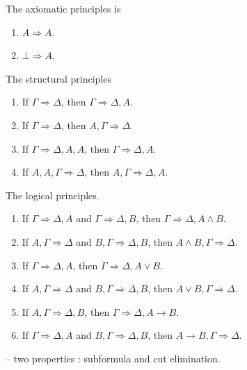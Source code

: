 \begin{definition}
    The axiomatic principles is 
    \begin{enumerate}
        \item \(A \Rightarrow A\).
        \item \(\bot \Rightarrow A\).
    \end{enumerate}
    The structural principles
    \begin{enumerate}
        \item If \(\Gamma \Rightarrow \Delta\), then \(\Gamma \Rightarrow \Delta,A\).
        \item If \(\Gamma \Rightarrow \Delta\), then \(A,\Gamma \Rightarrow \Delta\).
        \item If \(\Gamma \Rightarrow \Delta,A,A\), then \(\Gamma \Rightarrow \Delta,A\).
        \item If \(A,A,\Gamma \Rightarrow \Delta\), then \(A,\Gamma \Rightarrow \Delta,A\).
    \end{enumerate}
    The logical principles.
    \begin{enumerate}
        \item If \(\Gamma \Rightarrow \Delta,A\) and \(\Gamma \Rightarrow \Delta,B\), then \(\Gamma \Rightarrow \Delta,A\land B\).
        \item If \(A,\Gamma \Rightarrow \Delta\) and \(B,\Gamma \Rightarrow \Delta,B\), then \(A\land B,\Gamma \Rightarrow \Delta\).
        \item If \(\Gamma \Rightarrow \Delta,A\), then \(\Gamma \Rightarrow \Delta,A\lor B\).
        \item If \(A,\Gamma \Rightarrow \Delta\) and \(B,\Gamma \Rightarrow \Delta,B\), then \(A\lor B,\Gamma \Rightarrow \Delta\).
        \item If \(A,\Gamma \Rightarrow \Delta,B\), then \(\Gamma \Rightarrow \Delta,A\to B\).
        \item If \(\Gamma \Rightarrow \Delta,A\) and \(B,\Gamma \Rightarrow \Delta,B\), then \(A\to B,\Gamma \Rightarrow \Delta\).
    \end{enumerate}
    
\end{definition}

-- two properties : subformula and cut elimination.